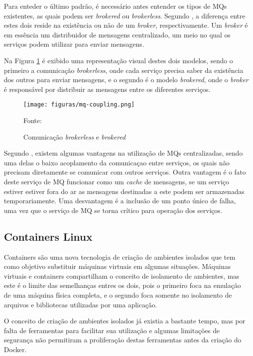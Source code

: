 Para enteder o último padrão, é necessário antes entender os tipos de \acp{MQ}
existentes, as quais podem ser \emph{brokered} ou \emph{brokerless}. Segundo
, a diferença entre estes dois reside na existência
ou não de um \emph{broker}, respectivamente. Um \emph{broker} é em essência um
distribuidor de mensagens centralizado, um meio no qual os serviços podem
utilizar para enviar mensagens.

Na Figura \ref{fig:mq-coupling} é exibido uma representação visual destes dois
modelos, sendo o primeiro a comunicação \emph{brokerless}, onde cada serviço
precisa saber da existência dos outros para enviar mensagens, e o segundo é
o modelo \emph{brokered}, onde o \emph{broker} é responsável por distribuir
as mensagens entre os diferentes serviços.

\begin{figure}[H]
	\centering
	\caption{Comunicação \emph{brokerless} e \emph{brokered}}
	\texttt{[image: figuras/mq-coupling.png]}

	\label{fig:mq-coupling}
	\footnotesize Fonte: 
\end{figure}

Segundo , existem algumas vantagens na utilização
de \acp{MQ} centralizadas, sendo uma delas o baixo acoplamento da comunicaçao
entre serviços, os quais não precisam diretamente se comunicar com outros
serviços. Outra vantagem é o fato deste serviço de \ac{MQ} funcionar como
um \emph{cache} de mensagens, se um serviço estiver estiver fora do ar as
mensagens destinadas a este podem ser armazenadas temporariamente. Uma
desvantagem é a inclusão de um ponto único de falha, uma vez que o serviço
de \ac{MQ} se torna crítico para operação dos serviços.

\subsection{Containers Linux}

Containers são uma nova tecnologia de criação de ambientes isolados que tem
como objetivo substituir máquinas virtuais em algumas situações. Máquinas
virtuais e containers compartilham o conceito de isolamento de ambientes, mas
este é o limite das semelhanças entres os dois, pois o primeiro foca na
emulação de uma máquina física completa, e o segundo foca somente no
isolamento de arquivos e bibliotecas utilizadas por uma aplicação.

O conceito de criação de ambientes isolados já existia a bastante tempo, mas
por falta de ferramentas para facilitar sua utilização e algumas limitações
de segurança não permitiram a proliferação destas ferramentas antes da criação
do Docker.

